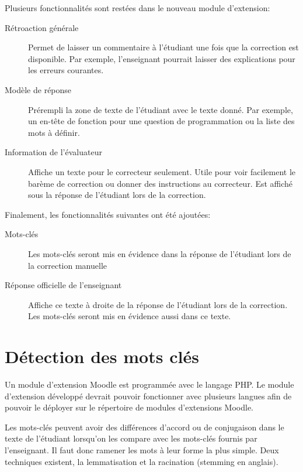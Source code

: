 Plusieurs fonctionnalités sont restées dans le nouveau module d'extension:

\begin{description}
  \item[Rétroaction générale]
  
  Permet de laisser un commentaire à l'étudiant une fois que la correction est disponible.
  Par exemple, l'enseignant pourrait laisser des explications pour les erreurs courantes.
  
  \item[Modèle de réponse]
  
  Prérempli la zone de texte de l'étudiant avec le texte donné.
  Par exemple, un en-tête de fonction pour une question de programmation ou la liste des mots à définir.
  
  \item[Information de l'évaluateur]
  
  Affiche un texte pour le correcteur seulement.
  Utile pour voir facilement le barème de correction ou donner des instructions au correcteur.
  Est affiché sous la réponse de l'étudiant lors de la correction.
\end{description}

Finalement, les fonctionnalités suivantes ont été ajoutées:

\begin{description}
  \item[Mots-clés]
  
  Les mots-clés seront mis en évidence dans la réponse de l'étudiant lors de la correction manuelle

  \item[Réponse officielle de l'enseignant]
  
  Affiche ce texte à droite de la réponse de l'étudiant lors de la correction.
  Les mots-clés seront mis en évidence aussi dans ce texte.
\end{description}

\section{Détection des mots clés}

Un module d'extension Moodle est programmée avec le langage PHP.
Le module d'extension développé devrait pouvoir fonctionner avec plusieurs langues afin de pouvoir le déployer sur le répertoire de modules d'extensions Moodle.

Les mots-clés peuvent avoir des différences d'accord ou de conjugaison dans le texte de l'étudiant lorsqu'on les compare avec les mots-clés fournis par l'enseignant.
Il faut donc ramener les mots à leur forme la plus simple.
Deux techniques existent, la lemmatisation et la racination (\og stemming \fg{} en anglais).

